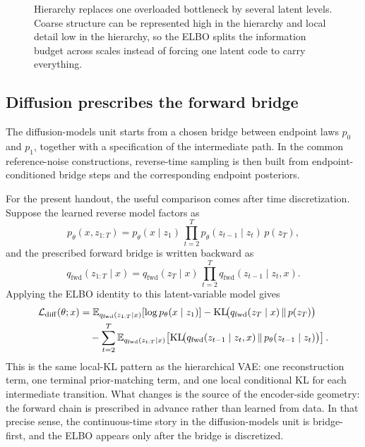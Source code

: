 \documentclass[11pt]{article}
\begin{document}
\begin{figure}[t]
  \centering
  
  \caption{Hierarchy replaces one overloaded bottleneck by several latent levels.
  Coarse structure can be represented high in the hierarchy and local detail low in the hierarchy, so the ELBO splits the information budget across scales instead of forcing one latent code to carry everything.}
  \label{fig:hierarchy-redistributes-kl}
\end{figure}

\subsection{Diffusion prescribes the forward bridge}
\label{subsec:fixed-encoder-geometry}

The diffusion-models unit starts from a chosen bridge between endpoint laws \(p_0\) and \(p_1\), together with a specification of the intermediate path.
In the common reference-noise constructions, reverse-time sampling is then built from endpoint-conditioned bridge steps and the corresponding endpoint posteriors.

For the present handout, the useful comparison comes after time discretization.
Suppose the learned reverse model factors as
\[
  p_\theta(x,z_{1:T})
  =
  p_\theta(x\mid z_1)\,
  \prod_{t=2}^T p_\theta(z_{t-1}\mid z_t)\,
  p(z_T),
\]
and the prescribed forward bridge is written backward as
\[
  q_{\mathrm{fwd}}(z_{1:T}\mid x)
  =
  q_{\mathrm{fwd}}(z_T\mid x)\,
  \prod_{t=2}^T q_{\mathrm{fwd}}(z_{t-1}\mid z_t,x).
\]
Applying the ELBO identity to this latent-variable model gives
\begin{align*}
  \mathcal{L}_{\mathrm{diff}}(\theta;x)
  &=
  \mathbb{E}_{q_{\mathrm{fwd}}(z_{1:T}\mid x)}[\log p_\theta(x\mid z_1)]
  -
  \operatorname{KL}\!\bigl(q_{\mathrm{fwd}}(z_T\mid x)\,\|\,p(z_T)\bigr) \\
  &\quad
  -
  \sum_{t=2}^T
  \mathbb{E}_{q_{\mathrm{fwd}}(z_{t:T}\mid x)}\!\left[
    \operatorname{KL}\!\bigl(q_{\mathrm{fwd}}(z_{t-1}\mid z_t,x)\,\|\,p_\theta(z_{t-1}\mid z_t)\bigr)
    \right].
\end{align*}
This is the same local-KL pattern as the hierarchical VAE:
one reconstruction term, one terminal prior-matching term, and one local conditional KL for each intermediate transition.
What changes is the source of the encoder-side geometry:
the forward chain is prescribed in advance rather than learned from data.
In that precise sense, the continuous-time story in the diffusion-models unit is bridge-first, and the ELBO appears only after the bridge is discretized.
\end{document}
